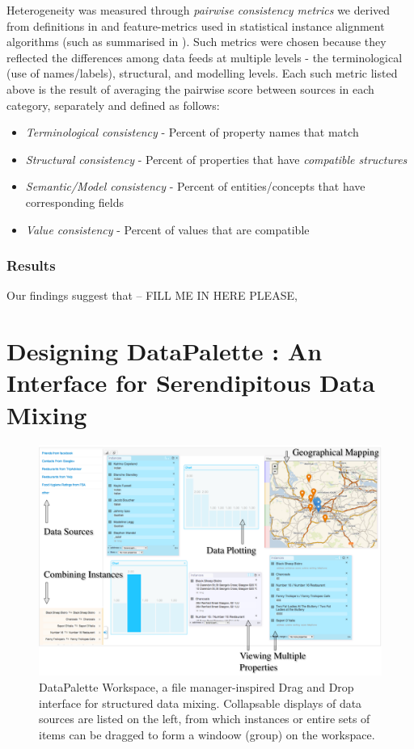 \documentclass{sigchi}
\begin{document}
Heterogeneity was measured through \emph{pairwise consistency metrics} we derived from definitions in \cite{george2005understanding} and feature-metrics used in statistical instance alignment algorithms (such as summarised in \cite{bhattacharya2007collective}). Such metrics were chosen because they reflected the differences among data feeds at multiple levels -  the terminological (use of names/labels), structural, and modelling levels. Each such metric listed above is the result of averaging the pairwise score between sources in each category, separately and defined as follows:

\begin{itemize}
\item \emph{Terminological consistency} - Percent of property names that match
\item \emph{Structural consistency} - Percent of properties that have \emph{compatible structures}
\item \emph{Semantic/Model consistency} - Percent of entities/concepts that have corresponding fields 
\item \emph{Value consistency} - Percent of values that are compatible
\end{itemize}

\subsubsection{Results}
Our findings suggest that -- FILL ME IN HERE PLEASE, 




\section{Designing DataPalette : An Interface for Serendipitous Data Mixing}
\begin{figure}[tbp]
\begin{center}
\includegraphics[width=18cm]{img/screenshot}
\caption{DataPalette Workspace, a file manager-inspired Drag and Drop interface for structured data mixing. Collapsable displays of data sources are listed on the left, from which instances or entire sets of items can be dragged to form a windoow (group) on the workspace.}
\label{fig:workspace}
\end{center}
\end{figure}
\end{document}
